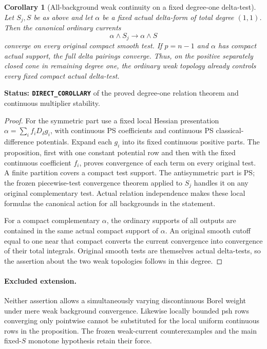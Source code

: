 \documentclass[11pt,a4paper]{article}
\numberwithin{equation}{section}
\newtheorem{corollary}[theorem]{Corollary}
\theoremstyle{definition}
\theoremstyle{remark}
\begin{document}
\begin{corollary}[All-background weak continuity on a fixed degree-one delta-test]
\label{cor:r6-all-background-degree-one-weak}
Let $S_j,S$ be as above and let $\alpha$ be a fixed actual delta-form
of total degree $(1,1)$. Then the canonical ordinary currents
\[
                         \alpha\wedge S_j\longrightarrow\alpha\wedge S
\]
converge on every original compact smooth test. If $p=n-1$ and
$\alpha$ has compact actual support, the full delta pairings converge.
Thus, on the positive separately closed cone in remaining degree one,
the ordinary weak topology already controls every fixed compact actual
delta-test.
\end{corollary}

\noindent\textbf{Status: \texttt{DIRECT\_COROLLARY}} of the proved
degree-one relation theorem and continuous multiplier stability.

\begin{proof}
For the symmetric part use a fixed local Hessian presentation
$\alpha=\sum_i f_iD_\delta g_i$, with continuous PS coefficients
and continuous PS classical-difference potentials. Expand each $g_i$
into its fixed continuous positive parts. The proposition, first
with one constant potential row and then with the fixed continuous
coefficient $f_i$, proves convergence of each term on every original
test. A finite partition covers a compact test support.
The antisymmetric part is PS; the frozen piecewise-test convergence
theorem applied to $S_j$ handles it on any original complementary
test. Actual relation independence makes these local formulas the
canonical action for all backgrounds in the statement.

For a compact complementary $\alpha$, the ordinary supports of all
outputs are contained in the same actual compact support of $\alpha$.
An original smooth cutoff equal to one near that compact converts the
current convergence into convergence of their total integrals.
Original smooth tests are themselves actual delta-tests, so the
assertion about the two weak topologies follows in this degree.
\end{proof}

\paragraph{Excluded extension.}
Neither assertion allows a simultaneously varying discontinuous Borel
weight under mere weak background convergence. Likewise locally bounded
psh rows converging only pointwise cannot be substituted for the local
uniform continuous rows in the proposition. The frozen weak-current
counterexamples and the main fixed-$S$ monotone hypothesis retain
their force.
\end{document}
